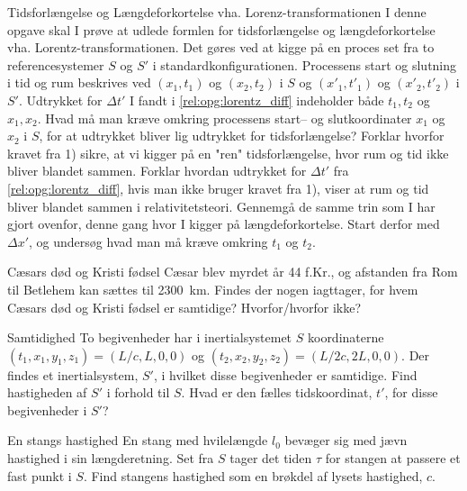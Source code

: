 \documentclass[crop=false, class=memoir]{standalone}
\begin{document}
\begin{opgave}[2]{Tidsforlængelse og Længdeforkortelse vha. Lorenz-transformationen}
	I denne opgave skal I prøve at udlede formlen for tidsforlængelse og længdeforkortelse vha. Lorentz-transformationen. Det gøres ved at kigge på en proces set fra to referencesystemer $S$ og $S'$ i standardkonfigurationen. Processens start og slutning i tid og rum beskrives ved $(x_1,t_1)$ og $(x_2,t_2)$ i $S$ og $(x'_1,t'_1)$ og $(x'_2,t'_2)$ i $S'$.
	\opg Udtrykket for $\Delta t'$ I fandt i \cref{rel:opg:lorentz_diff} indeholder både $t_1,t_2$ og $x_1,x_2$. Hvad må man kræve omkring processens start-- og slutkoordinater $x_1$ og $x_2$ i $S$, for at udtrykket bliver lig udtrykket for tidsforlængelse?
	\opg Forklar hvorfor kravet fra 1) sikre, at vi kigger på en "ren" tidsforlængelse, hvor rum og tid ikke bliver blandet sammen.
	\opg Forklar hvordan udtrykket for $\Delta t'$ fra \cref{rel:opg:lorentz_diff}, hvis man ikke bruger kravet fra 1), viser at rum og tid bliver blandet sammen i relativitetsteori.
	\opg Gennemgå de samme trin som I har gjort ovenfor, denne gang hvor I kigger på længdeforkortelse. Start derfor med $\Delta x'$, og undersøg hvad man må kræve omkring $t_1$ og $t_2$.
\end{opgave}

\begin{opgave}[2]{Cæsars død og Kristi fødsel}
	Cæsar blev myrdet år 44 f.Kr., og afstanden fra Rom til Betlehem kan sættes til \SI{2300}{\km}.
	\opg Findes der nogen iagttager, for hvem Cæsars død og Kristi fødsel er samtidige? Hvorfor/hvorfor ikke?
\end{opgave}

\begin{opgave}[2]{Samtidighed}
	To begivenheder har i inertialsystemet $S$ koordinaterne $(t_1,x_1,y_1,z_1)=(L/c,L,0,0)$ og $(t_2,x_2,y_2,z_2)=(L/2c,2L,0,0)$.
	\opg Der findes et inertialsystem, $S'$, i hvilket disse begivenheder er samtidige. Find hastigheden af $S'$ i forhold til $S$.
	\opg Hvad er den fælles tidskoordinat, $t'$, for disse begivenheder i $S'$?
\end{opgave}

\begin{opgave}[2]{En stangs hastighed}
	En stang med hvilelængde $l_0$ bevæger sig med jævn hastighed i sin længderetning. Set fra $S$ tager det tiden $\tau$ for stangen at passere et fast punkt i $S$. 
	\opg Find stangens hastighed som en brøkdel af lysets hastighed, $c$.
\end{opgave}
\end{document}

